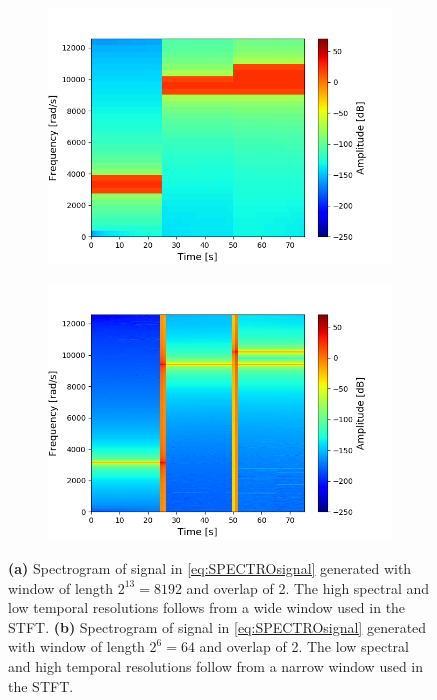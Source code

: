 \begin{figure}[H]
\centering
\begin{subfigure}{0.49\textwidth}
\centering
\includegraphics[width=\textwidth]{figures/validation/stft/1.png}
\caption{}
\label{fig:test_stft1}
\end{subfigure}
\begin{subfigure}{0.49\textwidth}
\centering
\includegraphics[width=\textwidth]{figures/validation/stft/2.png}
\caption{}
\label{fig:test_stft2}
\end{subfigure}
\caption{\textbf{(a)} Spectrogram of signal in \eqref{eq:SPECTROsignal} generated with window of length $2^{13}=8192$ and overlap of 2. The high spectral and low temporal resolutions follows from a wide window used in the STFT. \textbf{(b)} Spectrogram of signal in \eqref{eq:SPECTROsignal} generated with window of length $2^6=64$ and overlap of 2. The low spectral and high temporal resolutions follow from a narrow window used in the STFT.}
\label{fig:test_stft}
\end{figure}
